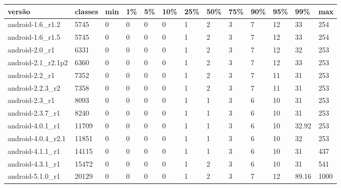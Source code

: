 \begin{tabular}{|l|l|l|l|l|l|l|l|l|l|l|l|l|}
\hline
versão&classes&min&1\%&5\%&10\%&25\%&50\%&75\%&90\%&95\%&99\%&max\\
\hline
android-1.6\_r1.2&5745&0&0&0&0&1&2&3&7&12&33&254\\
\hline
android-1.6\_r1.5&5745&0&0&0&0&1&2&3&7&12&33&254\\
\hline
android-2.0\_r1&6331&0&0&0&0&1&2&3&7&12&32&253\\
\hline
android-2.1\_r2.1p2&6360&0&0&0&0&1&2&3&7&12&33&253\\
\hline
android-2.2\_r1&7352&0&0&0&0&1&2&3&7&11&31&253\\
\hline
android-2.2.3\_r2&7358&0&0&0&0&1&2&3&7&11&31&253\\
\hline
android-2.3\_r1&8093&0&0&0&0&1&1&3&6&10&31&253\\
\hline
android-2.3.7\_r1&8240&0&0&0&0&1&1&3&6&10&31&253\\
\hline
android-4.0.1\_r1&11709&0&0&0&0&1&1&3&6&10&32.92&253\\
\hline
android-4.0.4\_r2.1&11851&0&0&0&0&1&1&3&6&10&32&253\\
\hline
android-4.1.1\_r1&14115&0&0&0&0&1&1&3&6&10&31&437\\
\hline
android-4.3.1\_r1&15472&0&0&0&0&1&2&3&6&10&31&541\\
\hline
android-5.1.0\_r1&20129&0&0&0&0&1&2&3&7&12&89.16&1000\\
\hline
\end{tabular}

